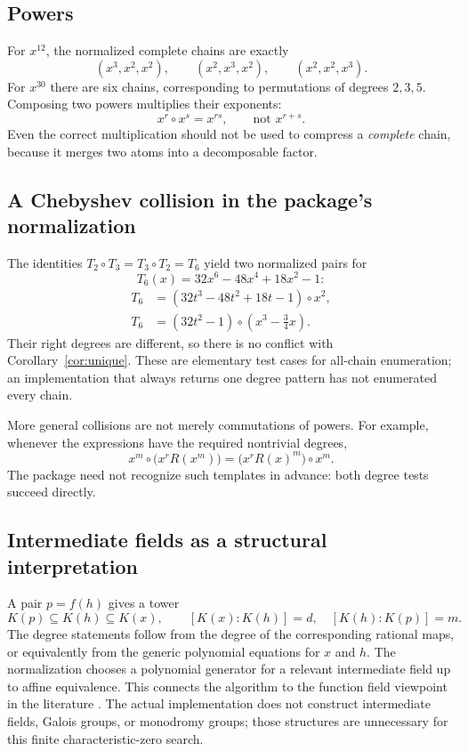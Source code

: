 \documentclass[11pt,a4paper]{article}
\numberwithin{equation}{section}
\theoremstyle{definition}
\theoremstyle{remark}
\begin{document}
\subsection{Powers}
For $x^{12}$, the normalized complete chains are exactly
\[
 (x^3,x^2,x^2),\qquad (x^2,x^3,x^2),\qquad (x^2,x^2,x^3).
\]
For $x^{30}$ there are six chains, corresponding to permutations of degrees
$2,3,5$. Composing two powers multiplies their exponents:
\begin{equation}
 x^r\circ x^s=x^{rs},\qquad\text{not }x^{r+s}.
 \label{eq:powerproduct}
\end{equation}
Even the correct multiplication should not be used to compress a
\emph{complete} chain, because it merges two atoms into a decomposable factor.

\subsection{A Chebyshev collision in the package's normalization}
The identities $T_2\circ T_3=T_3\circ T_2=T_6$ yield two normalized pairs for
\[
 T_6(x)=32x^6-48x^4+18x^2-1:
\]
\begin{align*}
 T_6&=(32t^3-48t^2+18t-1)\circ x^2,\\
 T_6&=(32t^2-1)\circ\left(x^3-\frac34x\right).
\end{align*}
Their right degrees are different, so there is no conflict with
Corollary~\ref{cor:unique}. These are elementary test cases for all-chain
enumeration; an implementation that always returns one degree pattern has
not enumerated every chain.

More general collisions are not merely commutations of powers. For example,
whenever the expressions have the required nontrivial degrees,
\[
 x^m\circ\bigl(x^rR(x^m)\bigr)
 =\bigl(x^rR(x)^m\bigr)\circ x^m.
\]
The package need not recognize such templates in advance: both degree tests
succeed directly.

\subsection{Intermediate fields as a structural interpretation}
A pair $p=f(h)$ gives a tower
\[
 K(p)\subseteq K(h)\subseteq K(x),
 \qquad [K(x):K(h)]=d,\quad [K(h):K(p)]=m.
\]
The degree statements follow from the degree of the corresponding rational
maps, or equivalently from the generic polynomial equations for $x$ and $h$.
The normalization chooses a polynomial generator for a relevant intermediate
field up to affine equivalence. This connects the algorithm to the function
field viewpoint in the literature \cite{KL,ZM}. The actual implementation
does not construct intermediate fields, Galois groups, or monodromy groups;
those structures are unnecessary for this finite characteristic-zero search.
\end{document}
